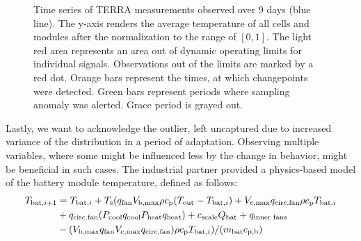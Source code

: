 \begin{figure}[htbp]
 \centering
 \caption{Time series of TERRA measurements observed over 9 days (blue line). The y-axis renders the average temperature of all cells and modules after the normalization to the range of $[0, 1]$. The light red area represents an area out of dynamic operating limits for individual signals. Observations out of the limits are marked by a red dot. Orange bars represent the times, at which changepoints were detected. Green bars represent periods where sampling anomaly was alerted. Grace period is grayed out.}
 \label{fig:terra_sampling}
\end{figure}

Lastly, we want to acknowledge the outlier, left uncaptured due to increased variance of the distribution in a period of adaptation. Observing multiple variables, where some might be influenced less by the change in behavior, might be beneficial in such cases. The industrial partner provided a physics-based model of the battery module temperature, defined as follows:
\begin{align}
 T _{\text{bat}, i+1} &= T _{\text{bat}, i} + T _{\text{s}} (q _{\text{fan}} V _{\text{b,max}} \rho c _{\text{p}} (T _{\text{out}} - T _{\text{bat}, i}) + V _{\text{c,max}}q _{\text{circ.fan}} \rho c _{\text{p}} T _{\text{bat}, i} \nonumber \\
 &+ q _{\text{circ.fan}} (P _{\text{cool}} q _{\text{cool}} P _{\text{heat}} q _{\text{heat}}) + c _{\text{scale}} Q _{\text{bat}} + q _{\text{inner fans}} \\
 &- (V _{\text{b,max}} q _{\text{fan}} V _{\text{c,max}} q _{\text{circ.fan}}) \rho c _{\text{p}} T _{\text{bat}, i}) / (m _{\text{bat}} c _{\text{p,b}}) \text{}\nonumber
\end{align}


